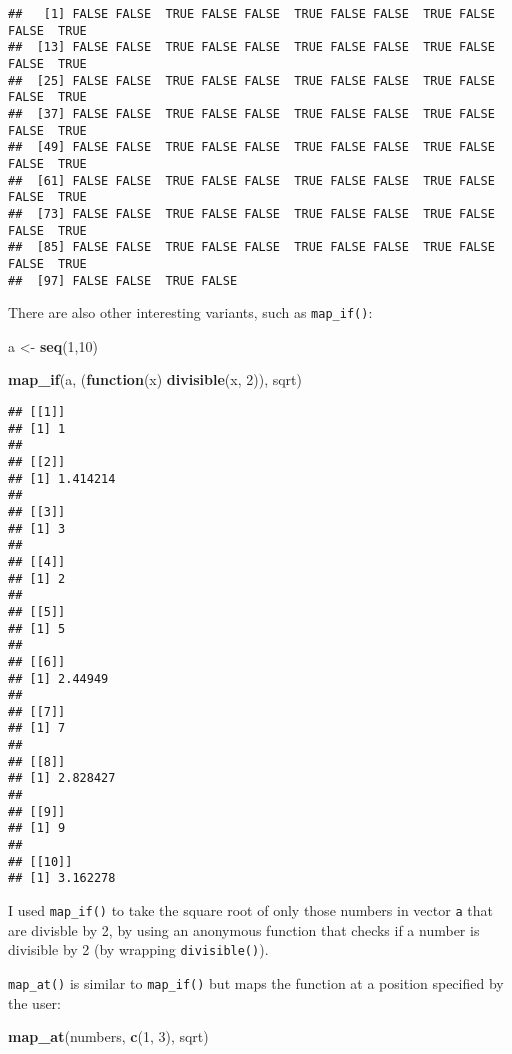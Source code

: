 \documentclass[
]{article}
\newenvironment{Shaded}{\begin{snugshade}}{\end{snugshade}}
\newcommand{\ControlFlowTok}[1]{\textcolor[rgb]{0.13,0.29,0.53}{\textbf{#1}}}
\newcommand{\DecValTok}[1]{\textcolor[rgb]{0.00,0.00,0.81}{#1}}
\newcommand{\KeywordTok}[1]{\textcolor[rgb]{0.13,0.29,0.53}{\textbf{#1}}}
\newcommand{\NormalTok}[1]{#1}
\newcommand{\StringTok}[1]{\textcolor[rgb]{0.31,0.60,0.02}{#1}}
\begin{document}
\begin{verbatim}
##   [1] FALSE FALSE  TRUE FALSE FALSE  TRUE FALSE FALSE  TRUE FALSE FALSE  TRUE
##  [13] FALSE FALSE  TRUE FALSE FALSE  TRUE FALSE FALSE  TRUE FALSE FALSE  TRUE
##  [25] FALSE FALSE  TRUE FALSE FALSE  TRUE FALSE FALSE  TRUE FALSE FALSE  TRUE
##  [37] FALSE FALSE  TRUE FALSE FALSE  TRUE FALSE FALSE  TRUE FALSE FALSE  TRUE
##  [49] FALSE FALSE  TRUE FALSE FALSE  TRUE FALSE FALSE  TRUE FALSE FALSE  TRUE
##  [61] FALSE FALSE  TRUE FALSE FALSE  TRUE FALSE FALSE  TRUE FALSE FALSE  TRUE
##  [73] FALSE FALSE  TRUE FALSE FALSE  TRUE FALSE FALSE  TRUE FALSE FALSE  TRUE
##  [85] FALSE FALSE  TRUE FALSE FALSE  TRUE FALSE FALSE  TRUE FALSE FALSE  TRUE
##  [97] FALSE FALSE  TRUE FALSE
\end{verbatim}

There are also other interesting variants, such as \texttt{map\_if()}:

\begin{Shaded}
\begin{Highlighting}[]
\NormalTok{a \textless{}{-}}\StringTok{ }\KeywordTok{seq}\NormalTok{(}\DecValTok{1}\NormalTok{,}\DecValTok{10}\NormalTok{)}

\KeywordTok{map\_if}\NormalTok{(a, (}\ControlFlowTok{function}\NormalTok{(x) }\KeywordTok{divisible}\NormalTok{(x, }\DecValTok{2}\NormalTok{)), sqrt)}
\end{Highlighting}
\end{Shaded}

\begin{verbatim}
## [[1]]
## [1] 1
## 
## [[2]]
## [1] 1.414214
## 
## [[3]]
## [1] 3
## 
## [[4]]
## [1] 2
## 
## [[5]]
## [1] 5
## 
## [[6]]
## [1] 2.44949
## 
## [[7]]
## [1] 7
## 
## [[8]]
## [1] 2.828427
## 
## [[9]]
## [1] 9
## 
## [[10]]
## [1] 3.162278
\end{verbatim}

I used \texttt{map\_if()} to take the square root of only those numbers in vector \texttt{a} that are divisble by 2,
by using an anonymous function that checks if a number is divisible by 2 (by wrapping \texttt{divisible()}).

\texttt{map\_at()} is similar to \texttt{map\_if()} but maps the function at a position specified by the user:

\begin{Shaded}
\begin{Highlighting}[]
\KeywordTok{map\_at}\NormalTok{(numbers, }\KeywordTok{c}\NormalTok{(}\DecValTok{1}\NormalTok{, }\DecValTok{3}\NormalTok{), sqrt)}
\end{Highlighting}
\end{Shaded}
\end{document}
